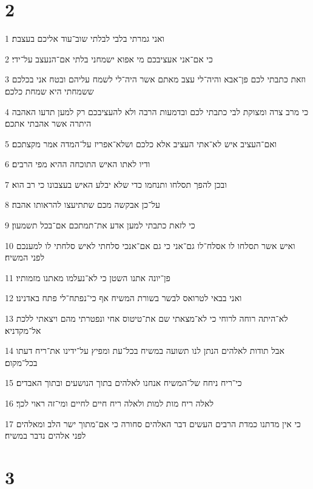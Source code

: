\chapter{2}

\par 1 ואני גמרתי בלבי לבלתי שוב־עוד אליכם בעצבת׃
\par 2 כי אם־אני אעציבכם מי אפוא ישמחני בלתי אם־הנעצב על־ידי׃
\par 3 וזאת כתבתי לכם פן־אבא והיה־לי עצב מאתם אשר היה־לי לשמח עליהם ובטח אני בכלכם ששמחתי היא שמחת כלכם׃
\par 4 כי מרב צרה ומצוקת לבי כתבתי לכם ובדמעות הרבה ולא להעציבכם רק למען תדעו האהבה היתרה אשר אהבתי אתכם׃
\par 5 ואם־העציב איש לא־אתי העציב אלא כלכם ושלא־אפריז על־המדה אמר מקצתכם׃
\par 6 ודיו לאתו האיש התוכחה ההיא מפי הרבים׃
\par 7 ובכן להפך תסלחו ותנחמו כדי שלא יבלע האיש בעצבונו כי רב הוא׃
\par 8 על־כן אבקשה מכם שתתיעצו להראותו אהבה׃
\par 9 כי לזאת כתבתי למען אדע את־תמתכם אם־בכל תשמעון׃
\par 10 ואיש אשר תסלחו לו אסלח־לו גם־אני כי גם אם־אנכי סלחתי לאיש סלחתי לו למענכם לפני המשיח׃
\par 11 פן־יונה אתנו השטן כי לא־נעלמו מאתנו מזמותיו׃
\par 12 ואני בבאי לטרואס לבשר בשורת המשיח אף כי־נפתח־לי פתח באדנינו׃
\par 13 לא־היתה רוחה לרוחי כי לא־מצאתי שם את־טיטוס אחי ונפטרתי מהם ויצאתי ללכת אל־מקדניא׃
\par 14 אבל תודות לאלהים הנתן לנו תשועה במשיח בכל־עת ומפיץ על־ידינו את־ריח דעתו בכל־מקום׃
\par 15 כי־ריח ניחח של־המשיח אנחנו לאלהים בתוך הנושעים ובתוך האבדים׃
\par 16 לאלה ריח מות למות ולאלה ריח חיים לחיים ומי־זה ראוי לכך׃
\par 17 כי אין מדתנו כמדת הרבים העשים דבר האלהים סחורה כי אם־מתוך ישר הלב ומאלהים לפני אלהים נדבר במשיח׃

\chapter{3}

